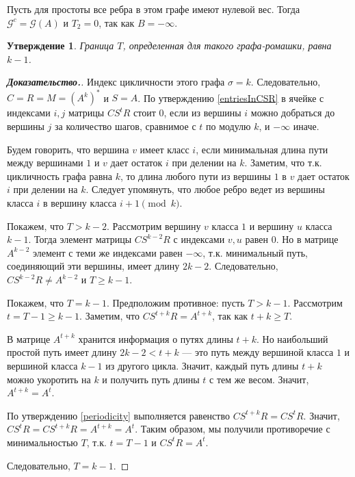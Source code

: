 \documentclass[12pt]{article}
\newtheorem{proposition}[theorem]{Утверждение}
\begin{document}
Пусть для простоты все ребра в этом графе имеют нулевой вес. Тогда $\mathcal{G}^c = \mathcal{G}(A)$ и $T_2 = 0$, так как $B = -\infty$.
\begin{proposition} Граница $T$, определенная для такого графа-ромашки, равна $k - 1$.
\label{chamomile}
\end{proposition}
\begin{proof}[\textbf{Доказательство.}]
Индекс цикличности этого графа $\sigma = k$. Следовательно, $C = R = M = (A^k)^*$ и $S = A$. По утверждению \ref{entriesInCSR} в ячейке с индексами $i, j$ матрицы $CS^tR$ стоит $0$, если из вершины $i$ можно добраться до вершины $j$ за количество шагов, сравнимое с $t$ по модулю $k$, и $-\infty$ иначе.

Будем говорить, что вершина $v$ имеет класс $i$, если минимальная длина пути между вершинами $1$ и $v$ дает остаток $i$ при делении на $k$. Заметим, что т.к. цикличность графа равна $k$, то длина любого пути из вершины $1$ в $v$ дает остаток $i$ при делении на $k$. Следует упомянуть, что любое ребро ведет из вершины класса $i$ в вершину класса $i + 1 \pmod{k}$.

Покажем, что $T > k - 2$. Рассмотрим вершину $v$ класса $1$ и вершину $u$ класса $k - 1$. Тогда элемент матрицы $CS^{k - 2}R$ с индексами $v, u$ равен $0$. Но в матрице $A^{k - 2}$ элемент с теми же индексами равен $-\infty$, т.к. минимальный путь, соединяющий эти вершины, имеет длину $2k - 2$. Следовательно, $CS^{k - 2}R \neq A^{k - 2}$ и $T \ge k - 1$.

Покажем, что $T = k - 1$. Предположим противное: пусть $T > k - 1$. Рассмотрим $t = T - 1 \ge k - 1$. Заметим, что $CS^{t + k}R = A^{t + k}$, так как $t + k \ge T$.

В матрице $A^{t+k}$ хранится информация о путях длины $t+k$. Но наибольший простой путь имеет длину $2k - 2 < t + k$ --- это путь между вершиной класса $1$ и вершиной класса $k - 1$ из другого цикла. Значит, каждый путь длины $t+k$ можно укоротить на $k$ и получить путь длины $t$ с тем же весом. Значит, $A^{t+k} = A^t$.

По утверждению \ref{periodicity} выполняется равенство $CS^{t + k}R = CS^tR$. Значит, $CS^tR = CS^{t + k}R = A^{t+k} = A^t$. Таким образом, мы получили противоречие с минимальностью $T$, т.к. $t = T - 1$ и $CS^tR = A^t$.

Следовательно, $T = k - 1$.
\end{proof}
\end{document}
